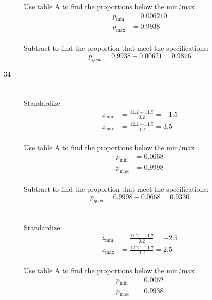 \documentclass[letterpaper, landscape]{exam}
\begin{document}
\begin{description}
        Use table A to find the proportions below the min/max
        \begin{align*}
          p_{\min} & = 0.006210 \\
          p_{\max} & = 0.9938 \\
        \end{align*}

        Subtract to find the proportion that meet the specifications:
        \[
          p_{good} = 0.9938 - 0.00621 = \boxed{ 0.9876 }
        \]

      \item[34]
        \begin{parts}
          
          \part{}
            Standardize:
            \begin{align*}
              z_{\min} &= \frac{11.2 - 11.5}{0.2} = -1.5 \\
              z_{\max} &= \frac{12.2 - 11.5}{0.2} = 3.5 \\
            \end{align*}

            Use table A to find the proportions below the min/max
            \begin{align*}
              p_{\min} & = 0.0668 \\
              p_{\max} & = 0.9998 \\
            \end{align*}

            Subtract to find the proportion that meet the specifications:
            \[
              p_{good} = 0.9998 - 0.0668 = \boxed{ 0.9330 }
            \]

            \part{}
              Standardize:
              \begin{align*}
                z_{\min} &= \frac{11.2 - 11.7}{0.2} = -2.5 \\
                z_{\max} &= \frac{12.2 - 11.7}{0.2} = 2.5 \\
              \end{align*}

              Use table A to find the proportions below the min/max
              \begin{align*}
                p_{\min} & = 0.0062 \\
                p_{\max} & = 0.9938 \\
              \end{align*}


\end{parts}
\end{description}
\end{document}
